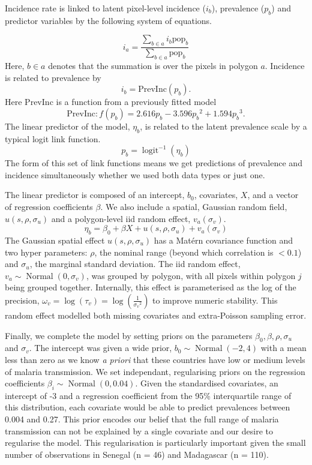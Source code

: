 \documentclass{statsoc}
\begin{document}
Incidence rate is linked to latent pixel-level incidence ($i_b$), prevalence ($p_b$) and predictor variables by the following system of equations.

$$i_a = \frac{ \sum_{b \in a}i_b \mathrm{pop}_b}{\sum_{b \in a}\mathrm{pop}_b} $$
Here, $b \in a$ denotes that the summation is over the pixels in polygon $a$. 
Incidence is related to prevalence by
$$i_b = \mathrm{PrevInc}(p_b).$$
Here $\mathrm{PrevInc}$ is a function from a previously fitted model \citep{cameron2015defining} 
$$\mathrm{PrevInc}: f\left(p_b\right) = 2.616p_b - 3.596{p_b}^2 + 1.594{p_b}^3.$$
The linear predictor of the model, $\eta_b$, is related to the latent prevalence scale by a typical logit link function.
$$p_b = \operatorname{logit}^{-1}(\eta_b)$$
The form of this set of link functions means we get predictions of prevalence and incidence simultaneously whether we used both data types or just one.

The linear predictor is composed of an intercept, $b_0$, covariates, $X$, and a vector of regression coefficients $\beta$.
We also include a spatial, Gaussian random field, $u(s, \rho, \sigma_u)$ and a polygon-level iid random effect, $ v_a(\sigma_v)$.
$$\eta_b = \beta_0 + \beta X  + u(s, \rho, \sigma_u) + v_a(\sigma_v) $$
The Gaussian spatial effect $u(s, \rho, \sigma_u)$ has a Mat\'ern covariance function and two hyper parameters: $\rho$, the nominal range (beyond which correlation is $< 0.1$) and $\sigma_u$, the marginal standard deviation.
The iid random effect, $v_a \sim \operatorname{Normal}(0, \sigma_v)$,  was grouped by polygon, with all pixels within polygon $j$ being grouped together.
Internally, this effect is parameterised as the log of the precision, $\omega_v = \log(\tau_v) = \log(\frac{1}{{\sigma_v}^2})$ to improve numeric stability.
This random effect modelled both missing covariates and extra-Poisson sampling error.


Finally, we complete the model by setting priors on the parameters $\beta_0, \beta, \rho, \sigma_u$ and $\sigma_v$.
The intercept was given a wide prior, $b_0 \sim \operatorname{Normal}(-2, 4)$ with a mean less than zero as we know \emph{a priori} that these countries have low or medium levels of malaria transmission.
We set independant, regularising priors on the regression coefficients $\beta_i \sim \operatorname{Normal}(0, 0.04)$. 
Given the standardised covariates, an intercept of -3 and a regression coefficient from the 95\% interquartile range of this distribution, each covariate would be able to predict prevalences between 0.004 and 0.27. 
This prior encodes our belief that the full range of malaria transmission can not be explained by a single covariate and our desire to regularise the model.
This regularisation is particularly important given the small number of observations in Senegal (n = 46) and Madagascar (n = 110).
\end{document}
